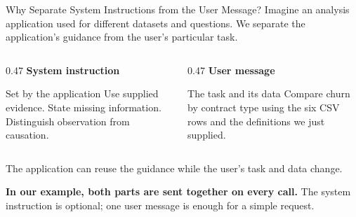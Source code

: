 \documentclass[aspectratio=169]{beamer}
\begin{document}
\begin{frame}{Why Separate System Instructions from the User Message?}
  \small Imagine an analysis application used for different datasets and questions. We separate the application's guidance from the user's particular task.
  \par\vspace{0.5em}
  \begin{columns}[T,onlytextwidth]
    \begin{column}{0.47\linewidth}
      \textbf{System instruction}
      \begin{block}{Set by the application}
        \small Use supplied evidence. State missing information. Distinguish observation from causation.
      \end{block}
    \end{column}
    \begin{column}{0.47\linewidth}
      \textbf{User message}
      \begin{block}{The task and its data}
        \small Compare churn by contract type using the six CSV rows and the definitions we just supplied.
      \end{block}
    \end{column}
  \end{columns}
  \vspace{0.5em}
  \small The application can reuse the guidance while the user's task and data change.
  \par\vspace{0.4em}
  \textbf{In our example, both parts are sent together on every call.} The system instruction is optional; one user message is enough for a simple request.
\end{frame}
\end{document}
